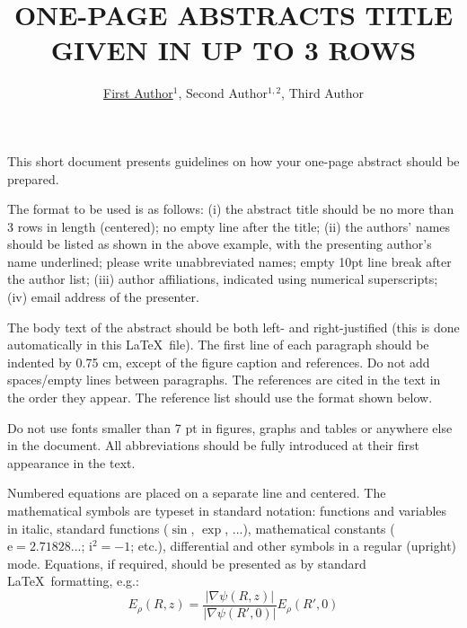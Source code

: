 \documentclass[a4paper,10pt,english]{article}
\begin{document}
\renewcommand{\figurename}{Fig.} 


\title{ONE-PAGE ABSTRACTS TITLE GIVEN IN UP TO 3 ROWS }
\author{\uline{First Author}$^{1}$, Second Author$^{1,2}$, Third Author}

\maketitle

\address{$^{1}$Department of Physics, University of X, Country (10 point)}
\address{$^{2}$Department of Chemistry, University of Y, Country}

This short document presents guidelines on how your one-page abstract should be prepared.  

The format to be used is as follows: (i) the abstract title should be no more than 3 rows in length (centered); no empty line after the title; (ii) the authors’ names should be listed as shown in the above example, with the presenting author’s name underlined; please write unabbreviated names; empty 10pt line break after the author list; (iii) author affiliations, indicated using numerical superscripts; (iv) email address of the presenter.

The body text of the abstract should be both left- and right-justified (this is done automatically in this \LaTeX \ file). The first line of each paragraph should be indented by 0.75 cm, except of the figure caption and references. Do not add spaces/empty lines between paragraphs. The references \cite{key-1} are cited in the text in the order they appear. The reference list should use the format shown below.

Do not use fonts smaller than 7 pt in figures, graphs and tables or anywhere else in the document. All abbreviations should be fully introduced at their first appearance in the text.

Numbered equations are placed on a separate line and centered. The mathematical symbols are typeset in standard notation: functions and variables in italic, standard functions ($\sin$, $\exp$, ...), mathematical constants ($\mathrm{e}=2.71828...$; $\mathrm{i}^2=-1$; etc.), differential and other symbols in a regular (upright) mode. Equations, if required, should be presented as by standard \LaTeX \ formatting, e.g.:
\begin{equation}
E_{\rho}(R, z) = \frac{|\nabla \psi (R, z)|}{| \nabla \psi (R', 0)|} E_{\rho}(R',0)
\end{equation}
\end{document}
